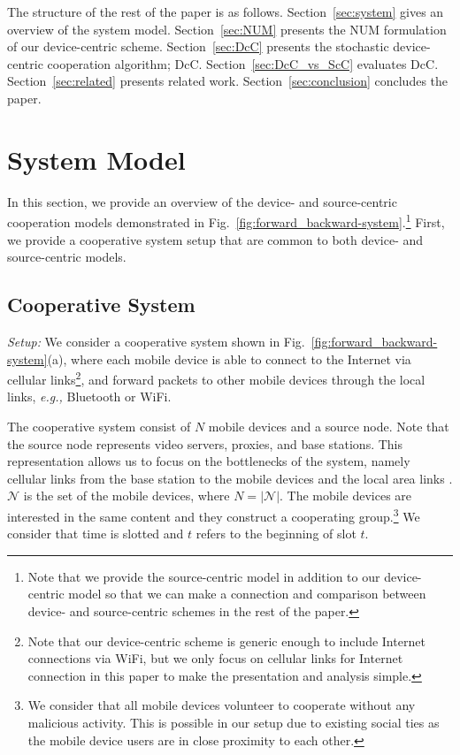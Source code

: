 \documentclass[conference]{IEEEtran}
\newcommand{\eg}{{\em e.g., }}
\newcommand{\Nset}{\mathcal{N}}
\begin{document}
The structure of the rest of the paper is as follows. Section~\ref{sec:system} gives an overview of the system model. Section~\ref{sec:NUM} presents the NUM formulation of our device-centric scheme. Section~\ref{sec:DcC} presents the stochastic device-centric cooperation algorithm; DcC. Section~\ref{sec:DcC_vs_ScC} evaluates DcC. Section~\ref{sec:related} presents related work. Section~\ref{sec:conclusion} concludes the paper.


\section{\label{sec:system}System Model}
In this section, we provide an overview of the device- and source-centric cooperation models demonstrated in Fig.~\ref{fig:forward_backward-system}.\footnote{Note that we provide the source-centric model in addition to our device-centric model so that we can make a connection and comparison between device- and source-centric schemes in the rest of the paper.} First, we provide a cooperative system setup that are common to both device- and source-centric models.

\subsection{Cooperative System}
{\em Setup:} We consider a cooperative system shown in Fig.~\ref{fig:forward_backward-system}(a), where each mobile device is able to connect to the Internet via cellular links\footnote{Note that our device-centric scheme is generic enough to include Internet connections via WiFi, but we only focus on cellular links for Internet connection in this paper to make the presentation and analysis simple.}, and forward packets to other mobile devices through the local links, \eg Bluetooth or WiFi.

The cooperative system consist of $N$ mobile devices and a source node. Note that the source node represents video servers, proxies, and base stations. This representation allows us to focus on the bottlenecks of the system, namely cellular links from the base station to the mobile devices and the local area links \cite{microcast_allerton}. $\Nset$ is the set of the mobile devices, where $N = |\Nset|$. The mobile devices are interested in the same content and they construct a cooperating group.\footnote{We consider that all mobile devices volunteer to cooperate without any malicious activity. This is possible in our setup due to existing social ties as the mobile device users are in close proximity to each other.}
We consider that time is slotted and $t$ refers to the beginning of slot $t$.
\end{document}
